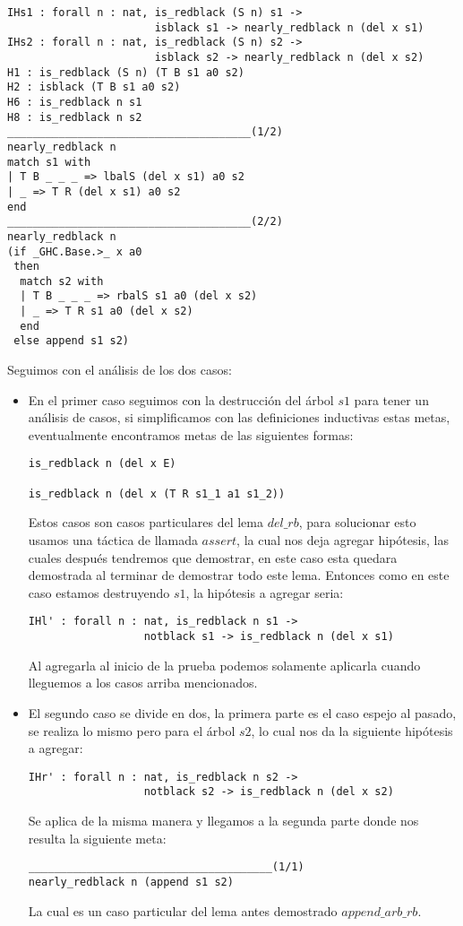 \begin{verbatim}
IHs1 : forall n : nat, is_redblack (S n) s1 ->
                       isblack s1 -> nearly_redblack n (del x s1)
IHs2 : forall n : nat, is_redblack (S n) s2 ->
                       isblack s2 -> nearly_redblack n (del x s2)
H1 : is_redblack (S n) (T B s1 a0 s2)
H2 : isblack (T B s1 a0 s2)
H6 : is_redblack n s1
H8 : is_redblack n s2
______________________________________(1/2)
nearly_redblack n
match s1 with
| T B _ _ _ => lbalS (del x s1) a0 s2
| _ => T R (del x s1) a0 s2
end
______________________________________(2/2)
nearly_redblack n
(if _GHC.Base.>_ x a0
 then
  match s2 with
  | T B _ _ _ => rbalS s1 a0 (del x s2)
  | _ => T R s1 a0 (del x s2)
  end
 else append s1 s2)
\end{verbatim}

Seguimos con el análisis de los dos casos:
\begin{itemize}
  \item En el primer caso seguimos con la destrucci\'on del \'arbol $s1$ para tener un análisis de
  casos, si simplificamos con las definiciones inductivas estas metas, eventualmente encontramos
  metas de las siguientes formas:
\begin{verbatim}
is_redblack n (del x E)

is_redblack n (del x (T R s1_1 a1 s1_2))
\end{verbatim}
  Estos casos son casos particulares del lema \hyperref[lema_6]{$del\_rb$}, para solucionar esto 
  usamos una táctica de {\coq} llamada $assert$, la cual nos deja agregar hip\'otesis, las cuales 
  después tendremos que demostrar, en este caso esta quedara demostrada al terminar de demostrar 
  todo este lema. Entonces como en este caso estamos destruyendo $s1$, la hip\'otesis a agregar 
  seria:
\begin{verbatim}
IHl' : forall n : nat, is_redblack n s1 ->
                  notblack s1 -> is_redblack n (del x s1)
\end{verbatim}
  Al agregarla al inicio de la prueba podemos solamente aplicarla cuando lleguemos a los casos
  arriba mencionados.
  \item El segundo caso se divide en dos, la primera parte es el caso espejo al pasado, se realiza 
  lo mismo pero para el \'arbol $s2$, lo cual nos da la siguiente hipótesis a agregar:
\begin{verbatim}
IHr' : forall n : nat, is_redblack n s2 ->
                  notblack s2 -> is_redblack n (del x s2)
\end{verbatim}
  Se aplica de la misma manera y llegamos a la segunda parte donde nos resulta la siguiente meta:
\begin{verbatim}
______________________________________(1/1)
nearly_redblack n (append s1 s2)
\end{verbatim}
  La cual es un caso particular del lema antes demostrado \hyperref[lema_4]{$append\_arb\_rb$}.
\end{itemize}


